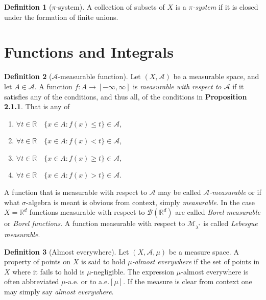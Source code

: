 \documentclass[12pt]{article}
\theoremstyle{definition}
\newtheorem{definition}{Definition}[section]
\newcommand{\real}{\mathbb{R}}   %
\newcommand{\algebra}{\mathscr{A}}
\begin{document}
\begin{definition}[$\pi$-system]
    A collection of subsets of $X$ is a \textit{$\pi$-system} if it is closed under the formation of finite unions.
\end{definition}
\newpage
\section{Functions and Integrals}
\begin{definition}[$\algebra$-measurable function]
    Let $(X,\algebra)$ be a measurable space, and let $A\in \algebra$. A function $f:A\to[-\infty,\infty]$ is \textit{measurable with respect to $\algebra$} if it satisfies any of the conditions, and thus all, of the conditions in \textbf{Proposition 2.1.1}. That is any of
    \begin{enumerate}[label=(\alph*)]
        \item $\forall t\in \real \quad \{x\in A: f(x)\leq t\}\in\algebra$,
        \item $\forall t\in \real \quad \{x\in A: f(x)< t\}\in\algebra$,
        \item $\forall t\in \real \quad \{x\in A: f(x)\geq t\}\in\algebra$,
        \item $\forall t\in \real \quad \{x\in A: f(x)> t\}\in\algebra$.
    \end{enumerate}
    A function that is measurable with respect to $\algebra$ may be called \textit{$\algebra$-measurable} or if what $\sigma$-algebra is meant is obvious from context, simply \textit{measurable}. In the case $X=\real^d$ functions measurable with respect to $\mathscr{B}(\real^d)$ are called \textit{Borel measurable} or \textit{Borel functions}. A function measurable with respect to $\mathscr{M}_{\lambda^*}$ is called \textit{Lebesgue measurable}.
\end{definition}
\begin{definition}[Almost everywhere]
    Let $(X,\algebra,\mu)$ be a measure space. A property of points on $X$ is said to hold \textit{$\mu$-almost everywhere} if the set of points in $X$ where it fails to hold is $\mu$-negligible. The expression $\mu$-almost everywhere is often abbreviated $\mu$-a.e. or to a.e.$[\mu]$. If the measure is clear from context one may simply say \textit{almost everywhere}.
\end{definition}
\end{document}
